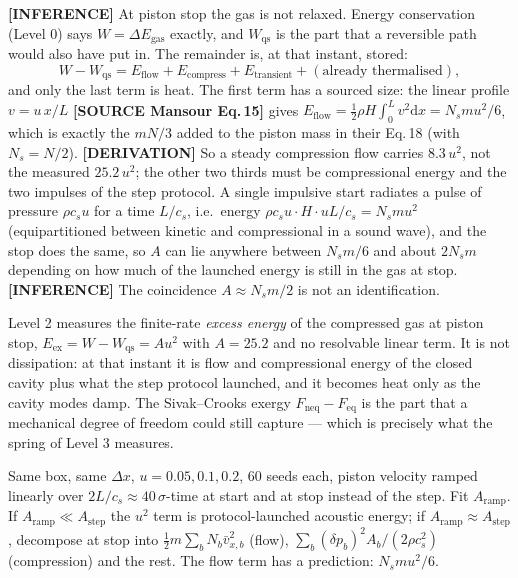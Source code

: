 \documentclass[11pt,a4paper]{article}
\newcommand{\dd}{\mathrm{d}}
\newcommand{\src}[1]{\textcolor{OliveGreen}{\textbf{[SOURCE #1]}}}
\newcommand{\der}{\textcolor{NavyBlue}{\textbf{[DERIVATION]}}}
\newcommand{\infr}{\textcolor{BurntOrange}{\textbf{[INFERENCE]}}}
\begin{document}
\infr{} At piston stop the gas is not relaxed. Energy conservation (Level 0) says $W = \Delta E_{\mathrm{gas}}$ exactly, and $W_{\mathrm{qs}}$ is the part that a reversible path would also have put in. The remainder is, at that instant, stored:
\begin{equation}
W - W_{\mathrm{qs}} = E_{\mathrm{flow}} + E_{\mathrm{compress}} + E_{\mathrm{transient}} + (\text{already thermalised}),
\end{equation}
and only the last term is heat. The first term has a sourced size: the linear profile $v = u\,x/L$ \src{Mansour Eq.\,15} gives $E_{\mathrm{flow}} = \tfrac12\rho H\!\int_0^L v^2 \dd x = N_s m u^2/6$, which is exactly the $mN/3$ added to the piston mass in their Eq.\,18 (with $N_s = N/2$). \der{} So a steady compression flow carries $8.3\,u^2$, not the measured $25.2\,u^2$; the other two thirds must be compressional energy and the two impulses of the step protocol. A single impulsive start radiates a pulse of pressure $\rho c_s u$ for a time $L/c_s$, i.e.\ energy $\rho c_s u\cdot H\cdot uL/c_s = N_s m u^2$ (equipartitioned between kinetic and compressional in a sound wave), and the stop does the same, so $A$ can lie anywhere between $N_s m/6$ and about $2N_s m$ depending on how much of the launched energy is still in the gas at stop. \infr{} The coincidence $A \approx N_s m/2$ is not an identification.

\begin{answer}
Level 2 measures the finite-rate \emph{excess energy} of the compressed gas at piston stop, $E_{\mathrm{ex}} = W - W_{\mathrm{qs}} = A u^2$ with $A = 25.2$ and no resolvable linear term. It is not dissipation: at that instant it is flow and compressional energy of the closed cavity plus what the step protocol launched, and it becomes heat only as the cavity modes damp. The Sivak--Crooks exergy $F_{\mathrm{neq}} - F_{\mathrm{eq}}$ is the part that a mechanical degree of freedom could still capture --- which is precisely what the spring of Level 3 measures.
\end{answer}

\begin{test}
Same box, same $\Delta x$, $u = 0.05, 0.1, 0.2$, 60 seeds each, piston velocity ramped linearly over $2L/c_s \approx 40\,\sigma$-time at start and at stop instead of the step. Fit $A_{\mathrm{ramp}}$. If $A_{\mathrm{ramp}} \ll A_{\mathrm{step}}$ the $u^2$ term is protocol-launched acoustic energy; if $A_{\mathrm{ramp}} \approx A_{\mathrm{step}}$, decompose at stop into $\tfrac12 m\sum_b N_b \bar v_{x,b}^2$ (flow), $\sum_b (\delta p_b)^2 A_b/(2\rho c_s^2)$ (compression) and the rest. The flow term has a prediction: $N_s m u^2/6$.
\end{test}
\end{document}
